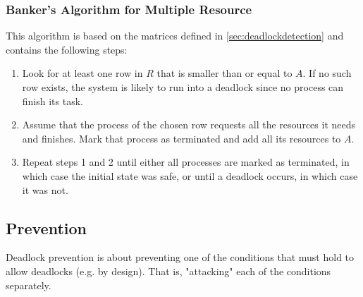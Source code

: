             \subsubsection{Banker's Algorithm for Multiple Resource}
                This algorithm is based on the matrices defined in \ref{sec:deadlockdetection} and contains the following steps:
                \begin{enumerate}
                	\item Look for at least one row in \(R\) that is smaller than or equal to \(A\). If no such row exists, the system is likely to run into a deadlock since no process can finish its task.
                	\item Assume that the process of the chosen row requests all the resources it needs and finishes. Mark that process as terminated and add all its resources to \(A\).
                	\item Repeat steps 1 and 2 until either all processes are marked as terminated, in which case the initial state was safe, or until a deadlock occurs, in which case it was not.
                \end{enumerate}

        \subsection{Prevention}
            Deadlock prevention is about preventing one of the conditions that must hold to allow deadlocks (e.g. by design). That is, "attacking" each of the conditions separately.

